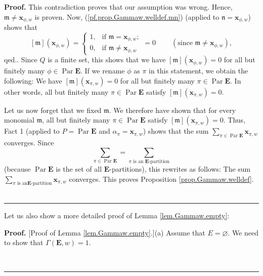 \documentclass[numbers=enddot,12pt,final,onecolumn,notitlepage,abstracton]{scrartcl}
\theoremstyle{definition}
\newenvironment{proof}[1][Proof]{\noindent\textbf{#1.} }{\ \rule{0.5em}{0.5em}}
\let\sumnonlimits\sum
\renewcommand{\sum}{\sumnonlimits\limits}
\newenvironment{verlong}{}{}
\begin{document}
\begin{verlong}
\begin{footnotesize}
\begin{proof}
{This contradiction proves that our assumption was wrong. Hence, $\mathfrak{m}%
\neq{\mathbf{x}}_{\phi,w}$ is proven. Now, (\ref{pf.prop.Gammaw.welldef.mn})
(applied to $\mathfrak{n}={\mathbf{x}}_{\phi,w}$) shows that%
\[
\left[  \mathfrak{m}\right]  \left(  {\mathbf{x}}_{\phi,w}\right)  =%
\begin{cases}
1, & \text{if }\mathfrak{m}={\mathbf{x}}_{\phi,w};\\
0, & \text{if }\mathfrak{m}\neq{\mathbf{x}}_{\phi,w}%
\end{cases}
=0\ \ \ \ \ \ \ \ \ \ \left(  \text{since }\mathfrak{m}\neq{\mathbf{x}}%
_{\phi,w}\right)  ,
\]
qed.}. Since $Q$ is a finite set, this shows that we have $\left[
\mathfrak{m}\right]  \left(  {\mathbf{x}}_{\phi,w}\right)  =0$ for all but
finitely many $\phi\in\operatorname*{Par}\mathbf{E}$. If we rename $\phi$ as
$\pi$ in this statement, we obtain the following: We have $\left[
\mathfrak{m}\right]  \left(  {\mathbf{x}}_{\pi,w}\right)  =0$ for all but
finitely many $\pi\in\operatorname*{Par}\mathbf{E}$. In other words, all but
finitely many $\pi\in\operatorname*{Par}\mathbf{E}$ satisfy $\left[
\mathfrak{m}\right]  \left(  {\mathbf{x}}_{\pi,w}\right)  =0$.

Let us now forget that we fixed $\mathfrak{m}$. We therefore have shown that
for every monomial $\mathfrak{m}$, all but finitely many $\pi\in
\operatorname*{Par}\mathbf{E}$ satisfy $\left[  \mathfrak{m}\right]  \left(
{\mathbf{x}}_{\pi,w}\right)  =0$. Thus, Fact 1 (applied to
$P=\operatorname*{Par}\mathbf{E}$ and $\alpha_{\pi}={\mathbf{x}}_{\pi,w}$)
shows that the sum $\sum_{\pi\in\operatorname*{Par}\mathbf{E}}{\mathbf{x}%
}_{\pi,w}$ converges. Since%
\[
\sum_{\pi\in\operatorname*{Par}\mathbf{E}}=\sum_{\pi\text{ is an }%
\mathbf{E}\text{-partition}}%
\]
(because $\operatorname*{Par}\mathbf{E}$ is the set of all $\mathbf{E}%
$-partitions), this rewrites as follows: The sum $\sum_{\pi\text{ is an
}{\mathbf{E}}\text{-partition}}{\mathbf{x}}_{\pi,w}$ converges. This proves
Proposition \ref{prop.Gammaw.welldef}.
\end{proof}

Let us also show a more detailed proof of Lemma \ref{lem.Gammaw.empty}:

\begin{proof}
[Proof of Lemma \ref{lem.Gammaw.empty}.](a) Assume that $E=\varnothing$. We
need to show that $\Gamma\left(  \mathbf{E},w\right)  =1$.


\end{proof}
\end{footnotesize}
\end{verlong}
\end{document}
